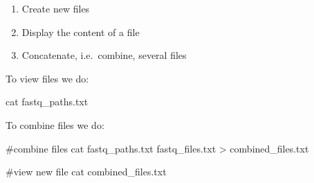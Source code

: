 \documentclass[
  letterpaper,
  DIV=11,
  numbers=noendperiod]{scrreprt}
\newenvironment{Shaded}{}{}
\newcommand{\CommentTok}[1]{\textcolor[rgb]{0.42,0.45,0.49}{#1}}
\newcommand{\FunctionTok}[1]{\textcolor[rgb]{0.44,0.26,0.76}{#1}}
\newcommand{\NormalTok}[1]{\textcolor[rgb]{0.14,0.16,0.18}{#1}}
\newcommand{\OperatorTok}[1]{\textcolor[rgb]{0.14,0.16,0.18}{#1}}
\providecommand{\tightlist}{%
  \setlength{\itemsep}{0pt}\setlength{\parskip}{0pt}}\usepackage{longtable,booktabs,array}
\begin{document}
\begin{enumerate}
\def\labelenumi{\arabic{enumi}.}
\tightlist
\item
  Create new files
\item
  Display the content of a file
\item
  Concatenate, i.e.~combine, several files
\end{enumerate}

To view files we do:

\begin{Shaded}
\begin{Highlighting}[]
\FunctionTok{cat}\NormalTok{ fastq\_paths.txt}
\end{Highlighting}
\end{Shaded}

To combine files we do:

\begin{Shaded}
\begin{Highlighting}[]
\CommentTok{\#combine files }
\FunctionTok{cat}\NormalTok{ fastq\_paths.txt fastq\_files.txt }\OperatorTok{\textgreater{}}\NormalTok{ combined\_files.txt}

\CommentTok{\#view new file }
\FunctionTok{cat}\NormalTok{ combined\_files.txt}
\end{Highlighting}
\end{Shaded}
\end{document}
